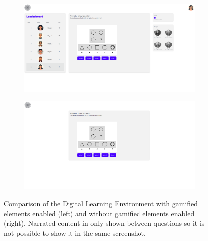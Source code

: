 \begin{figure}[H]
  \centering
  \begin{subfigure}[t]{\textwidth}
    \includegraphics[width=\textwidth]{img/question_screen.png}
    \label{fig:figureScreenEnabled}
  \end{subfigure}
  \vspace{5mm}
  \begin{subfigure}[t]{\textwidth}
    \includegraphics[width=\textwidth]{img/question_screen_no_elements.png}
    \label{fig:figureScreenDisabled}
  \end{subfigure}
  \caption{Comparison of the Digital Learning Environment with gamified elements enabled (left) and without gamified elements enabled (right). Narrated content in only shown between questions so it is not possible to show it in the same screenshot.}
  \label{fig:figureScreen}
\end{figure}

